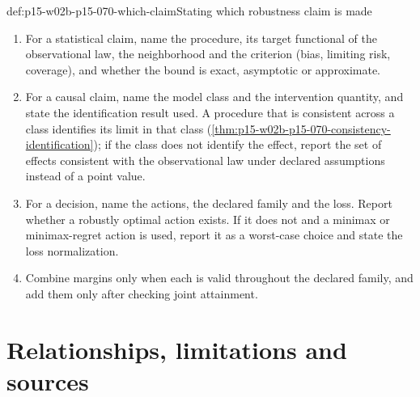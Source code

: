 \begin{hbmethod}{def:p15-w02b-p15-070-which-claim}{Stating which robustness claim is made}
\begin{enumerate}
\item For a statistical claim, name the procedure, its target functional
      of the observational law, the neighborhood and the criterion
      (bias, limiting risk, coverage), and whether the bound is exact,
      asymptotic or approximate.
\item For a causal claim, name the model class and the intervention
      quantity, and state the identification result used. A procedure
      that is consistent across a class identifies its limit in that
      class (\cref{thm:p15-w02b-p15-070-consistency-identification});
      if the class does not identify the effect, report the set of
      effects consistent with the observational law under declared
      assumptions instead of a point value.
\item For a decision, name the actions, the declared family and the loss.
      Report whether a robustly optimal action exists. If it does not and
      a minimax or minimax-regret action is used, report it as a
      worst-case choice and state the loss normalization.
\item Combine margins only when each is valid throughout the declared
      family, and add them only after checking joint attainment.
\end{enumerate}
\end{hbmethod}

\section{Relationships, limitations and sources}
\label{sec:p15-w02b-p15-070-relations}


